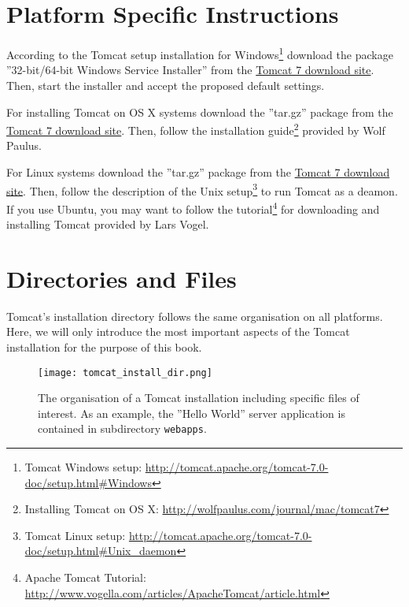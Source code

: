\documentclass[a4paper,10pt,twoside]{book}
\begin{document}
\section{Platform Specific Instructions}

According to the Tomcat setup installation for Windows\footnote{
Tomcat Windows setup: \url{http://tomcat.apache.org/tomcat-7.0-doc/setup.html\#Windows}
}
download the package ''32-bit/64-bit Windows Service Installer'' from the \href{http://tomcat.apache.org/download-70.cgi}{Tomcat 7 download site}.
Then, start the installer and accept the proposed default settings.

For installing Tomcat on OS X systems download the ''tar.gz'' package from the \href{http://tomcat.apache.org/download-70.cgi}{Tomcat 7 download site}.
Then, follow the installation guide\footnote{
Installing Tomcat on OS X: \url{http://wolfpaulus.com/journal/mac/tomcat7}
} provided by Wolf Paulus.

For Linux systems download the ''tar.gz'' package from the \href{http://tomcat.apache.org/download-70.cgi}{Tomcat 7 download site}.
Then, follow the description of the Unix setup\footnote{
Tomcat Linux setup: \url{http://tomcat.apache.org/tomcat-7.0-doc/setup.html\#Unix_daemon}
}
to run Tomcat as a deamon.
If you use Ubuntu, you may want to follow the tutorial\footnote{
Apache Tomcat Tutorial: \url{http://www.vogella.com/articles/ApacheTomcat/article.html}
} 
for downloading and installing Tomcat provided by Lars Vogel.


\section{Directories and Files}

Tomcat's installation directory follows the same organisation on all platforms.
Here, we will only introduce the most important aspects of the Tomcat installation for the purpose of this book.

\begin{figure}
\texttt{[image: tomcat\_install\_dir.png]}
\caption{The organisation of a Tomcat installation including specific files of interest.
As an example, the ''Hello World'' server application is contained in subdirectory \texttt{webapps}.
}
\end{figure}
\end{document}
